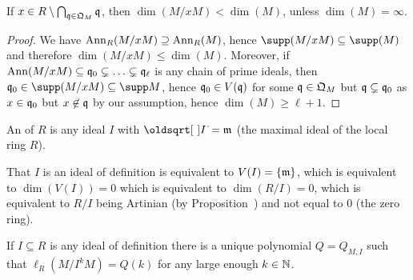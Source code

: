 \documentclass[a4paper,parskip=half,numbers=enddot, DIV=12]{scrreprt}
\begin{document}
\begin{fact}
    If $x\in R\setminus\bigcap_{\mathfrak{q}\in \mathfrak{Q}_M}\mathfrak{q}$, then $\dim(M/x M) <\dim(M)$, unless $\dim(M) =\infty$.
\end{fact}
\begin{proof}
    We have $\operatorname{Ann}_R(M/x M) \supseteq \operatorname{Ann}_R(M)$, hence $\supp (M/x M) \subseteq \supp (M)$ and therefore $\dim(M/x M) \leq \dim(M)$. Moreover, if $\operatorname{Ann}(M/x M) \subseteq \mathfrak{q}_0 \subsetneq \ldots \subsetneq \mathfrak{q}_\ell$ is any chain of prime ideals, then $\qq_0 \in \supp(M/x M)\subseteq \supp M$, hence $\mathfrak{q}_0\in V(\mathfrak{q})$ for some $\mathfrak{q}\in \mathfrak{Q}_M$ but $\mathfrak{q}\subsetneq \mathfrak{q}_0$ as $x\in \mathfrak{q}_0$ but $x\not\in \mathfrak{q}$ by our assumption, hence $\dim(M)\geq \ell+1$.
\end{proof}
\begin{defi}
    An  of $R$ is any ideal $I$ with $\sqrt{I} = \mm$ (the maximal ideal of the local ring $R$).
\end{defi}
\begin{rem*}
    That $I$ is an ideal of definition is equivalent to $V(I) = \{\mathfrak{m}\}$, which is equivalent to $\dim(V(I)) = 0$ which is equivalent to $\dim(R/I ) = 0$, which is equivalent to $R/I$ being Artinian (by Proposition~) and not equal to $0$ (the zero ring).
\end{rem*}
\begin{fact}
    If $I\subseteq R$ is any ideal of definition there is a unique polynomial $Q= Q_{M,I}$ such that $\ell_R(M/I^kM) = Q(k)$ for any large enough $k\in \mathbb{N}$.
\end{fact}
\end{document}
